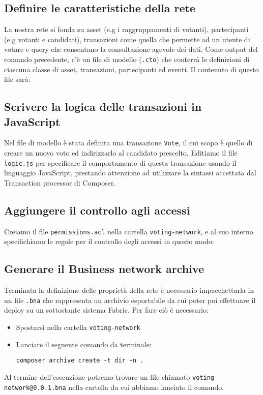 	\subsection{Definire le caratteristiche della rete}
		La nostra rete si fonda su asset (e.g i raggruppamenti di votanti), partecipanti (e.g votanti e candidati), transazioni come quella che permette ad un utente di votare e query che consentano la consultazione agevole dei dati. Come output del comando precedente, c'è un file di modello (\lstinline{.cto}) che conterrà le definizioni di ciascuna classe di asset, transazioni, partecipanti ed eventi. Il contenuto di questo file sarà:
		

	\subsection{Scrivere la logica delle transazioni in JavaScript}
		Nel file di modello è stata definita una transazione \lstinline{Vote}, il cui scopo è quello di creare un nuovo voto ed indirizzarlo al candidato prescelto. Editiamo il file \lstinline{logic.js} per specificare il comportamento di questa transazione usando il linguaggio JavaScript, prestando attenzione ad utilizzare la sintassi accettata dal Transaction processor di Composer.
		

	\subsection{Aggiungere il controllo agli accessi}
		Creiamo il file \lstinline{permissions.acl} nella cartella \lstinline{voting-network}, e al suo interno specifichiamo le regole per il controllo degli accessi in questo modo:
		

	\subsection{Generare il Business network archive}
		Terminata la definizione delle proprietà della rete è necessario impacchettarla in un file \lstinline{.bna} che rappresenta un archivio esportabile da cui poter poi effettuare il deploy su un sottostante sistema Fabric.
		Per fare ciò è necessario:
		\begin{itemize}
			\item Spostarsi nella cartella \lstinline{voting-network}
			\item Lanciare il seguente comando da terminale:
\begin{lstlisting}
composer archive create -t dir -n .
\end{lstlisting}
		\end{itemize}
		Al termine dell'esecuzione potremo trovare un file chiamato \lstinline{voting-network@0.0.1.bna} nella cartella da cui abbiamo lanciato il comando.
		

